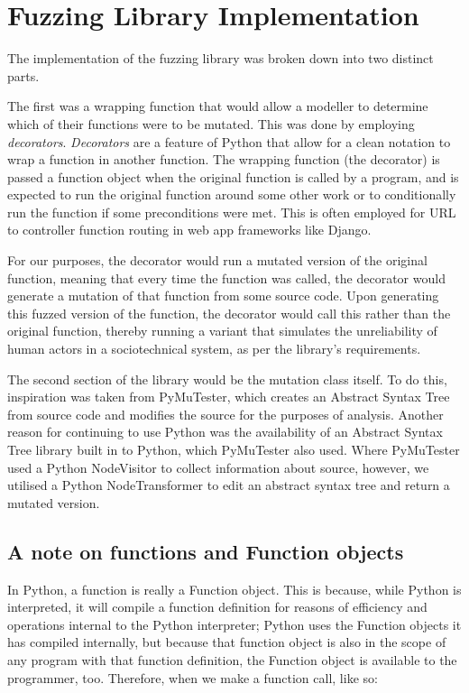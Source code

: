 \chapter{Fuzzing Library Implementation}
\label{fuzzing_implementation_head}
The implementation of the fuzzing library was broken down into two distinct parts. \par

The first was a wrapping function that would allow a modeller to determine which of their functions were to be mutated. This was done by employing \emph{decorators}. \emph{Decorators} are a feature of Python that allow for a clean notation to wrap a function in another function. The wrapping function (the decorator) is passed a function object when the original function is called by a program, and is expected to run the original function around some other work or to conditionally run the function if some preconditions were met. This is often employed for URL to controller function routing in web app frameworks like Django\cite{Azzopardi2016a}. \par

For our purposes, the decorator would run a mutated version of the original function, meaning that every time the function was called, the decorator would generate a mutation of that function from some source code. Upon generating this fuzzed version of the function, the decorator would call this rather than the original function, thereby running a variant that simulates the unreliability of human actors in a sociotechnical system, as per the library's requirements. \par

The second section of the library would be the mutation class itself. To do this, inspiration was taken from PyMuTester\cite{GitHu12:online}, which creates an Abstract Syntax Tree from source code and modifies the source for the purposes of analysis. Another reason for continuing to use Python was the availability of an Abstract Syntax Tree library built in to Python\cite{32.2.7:online}, which PyMuTester also used. Where PyMuTester used a Python NodeVisitor to collect information about source, however, we utilised a Python NodeTransformer to edit an abstract syntax tree and return a mutated version. \par

\section{A note on functions and Function objects}
In Python, a function is really a Function object. This is because, while Python is interpreted, it will compile a function definition for reasons of efficiency and operations internal to the Python interpreter; Python uses the Function objects it has compiled internally, but because that function object is also in the scope of any program with that function definition, the Function object is available to the programmer, too. Therefore, when we make a function call, like so: \par

